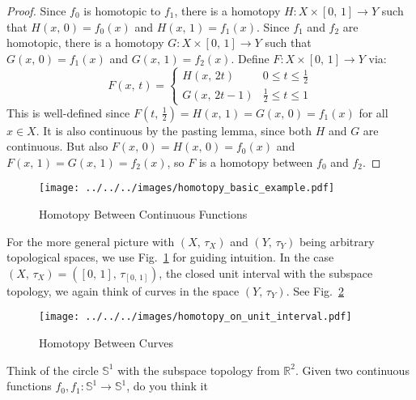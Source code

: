 \documentclass{article}
\theoremstyle{plain}
\theoremstyle{normal}
\begin{document}
        \begin{proof}
            Since $f_{0}$ is homotopic to $f_{1}$, there is a homotopy
            $H:X\times[0,\,1]\rightarrow{Y}$ such that $H(x,\,0)=f_{0}(x)$ and
            $H(x,\,1)=f_{1}(x)$. Since $f_{1}$ and $f_{2}$ are homotopic, there
            is a homotopy $G:X\times[0,\,1]\rightarrow{Y}$ such that
            $G(x,\,0)=f_{1}(x)$ and $G(x,\,1)=f_{2}(x)$. Define
            $F:X\times[0,\,1]\rightarrow{Y}$ via:
            \begin{equation}
                F(x,\,t)=
                \begin{cases}
                    H(x,\,2t)&0\leq{t}\leq\frac{1}{2}\\
                    G(x,\,2t-1)&\frac{1}{2}\leq{t}\leq{1}
                \end{cases}
            \end{equation}
            This is well-defined since
            $F(t,\,\tfrac{1}{2})=H(x,\,1)=G(x,\,0)=f_{1}(x)$ for all
            $x\in{X}$. It is also continuous by the pasting lemma, since both
            $H$ and $G$ are continuous. But also
            $F(x,\,0)=H(x,\,0)=f_{0}(x)$ and $F(x,\,1)=G(x,\,1)=f_{2}(x)$, so
            $F$ is a homotopy between $f_{0}$ and $f_{2}$.
        \end{proof}
        \begin{figure}
            \centering
            \texttt{[image: ../../../images/homotopy\_basic\_example.pdf]}
            \caption{Homotopy Between Continuous Functions}
            \label{fig:homotopy_basic_example}
        \end{figure}
        For the more general picture with $(X,\,\tau_{X})$ and $(Y,\,\tau_{Y})$
        being arbitrary topological spaces, we use
        Fig.~\ref{fig:homotopy_basic_example} for guiding intuition. In the
        case $(X,\,\tau_{X})=([0,\,1],\,\tau_{[0,\,1]})$, the closed unit
        interval with the subspace topology, we again think of curves in the
        space $(Y,\,\tau_{Y})$. See
        Fig.~\ref{fig:homotopy_on_unit_interval}
        \begin{figure}[H]
            \centering
            \texttt{[image: ../../../images/homotopy\_on\_unit\_interval.pdf]}
            \caption{Homotopy Between Curves}
            \label{fig:homotopy_on_unit_interval}
        \end{figure}
        Think of the circle $\mathbb{S}^{1}$ with the subspace topology from
        $\mathbb{R}^{2}$. Given two continuous functions
        $f_{0},f_{1}:\mathbb{S}^{1}\rightarrow\mathbb{S}^{1}$, do you think it
\end{document}
